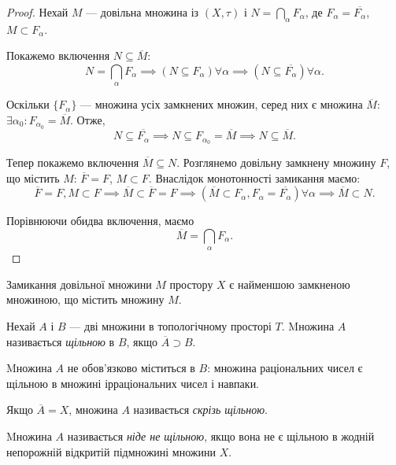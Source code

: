 \documentclass[a4paper, 12pt]{article}
\begin{document}
\begin{proof}
	Нехай $M$ --- довільна множина із $(X, \tau)$ і
	$N = \bigcap_\alpha F_\alpha$, де $F_\alpha = \overline{F_\alpha}$, $M \subset F_\alpha$. \smallskip

	Покажемо включення $N \subseteq \overline{M}$: \[N = \bigcap_\alpha F_\alpha \implies (N \subseteq F_\alpha) \forall \alpha \implies (N \subseteq \overline{F_\alpha}) \forall \alpha.\]

	Оскільки $\{F_\alpha\}$ --- множина усіх замкнених множин, серед
	них є множина $\overline{M}$: $\exists \alpha_0: F_{\alpha_0} = \overline{M}$. Отже, \[ N \subseteq \overline{F_\alpha} \implies N \subseteq F_{\alpha_0} = \overline{M} \implies N \subseteq \overline{M}. \]

	Тепер покажемо включення $\overline{M} \subseteq N$. Розглянемо довільну замкнену множину $F$, що містить $M$: $\overline{F} = F$, $M \subset F$. Внаслідок монотонності замикання маємо: \[ \overline{F} = F, M \subset F \implies \overline{M} \subset \overline{F} = F \implies (\overline{M} \subset F_\alpha, F_\alpha = \overline{F_\alpha}) \forall \alpha \implies \overline{M} \subset N. \]

	Порівнюючи обидва включення, маємо \[ \overline{M} = \bigcap_\alpha F_\alpha. \]
\end{proof}

\begin{corollary}
	Замикання довільної множини $M$ простору
	$X$ є найменшою замкненою множиною, що містить
	множину $M$.
\end{corollary}

\begin{definition}
	Нехай $A$ і $B$ --- дві множини в топологічному
	просторі $T$. Mножина $A$ називається \textit{щільною} в $B$, якщо
	$\overline{A} \supset B$.
\end{definition}

\begin{remark}
	Mножина $A$ не обов'язково міститься в
	$B$: множина раціональних чисел є щільною в множині
	ірраціональних чисел і навпаки.
\end{remark}

\begin{definition}
	Якщо $\overline{A} = X$, множина $A$ називається \textit{скрізь
	щільною}. 
\end{definition}

\begin{definition}
	Mножина $A$ називається \textit{ніде не щільною},
	якщо вона не є щільною в жодній непорожній відкритій
	підмножині множини $X$.
\end{definition}
\end{document}

